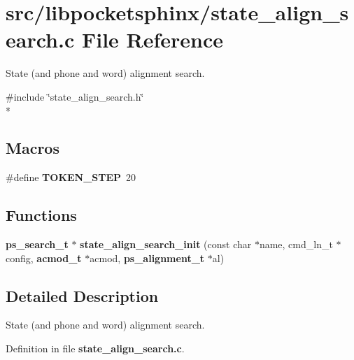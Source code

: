 \section{src/libpocketsphinx/state\-\_\-align\-\_\-search.c File Reference}
\label{state__align__search_8c}


State (and phone and word) alignment search.  


{\ttfamily \#include \char`\"{}state\-\_\-align\-\_\-search.\-h\char`\"{}}\\*
\subsection*{Macros}
\begin{DoxyCompactItemize}
\item 
\#define {\bfseries T\-O\-K\-E\-N\-\_\-\-S\-T\-E\-P}~20\label{state__align__search_8c_a197a0cf5b150b88b0e3043fd78550931}

\end{DoxyCompactItemize}
\subsection*{Functions}
\begin{DoxyCompactItemize}
\item 
{\bf ps\-\_\-search\-\_\-t} $\ast$ {\bfseries state\-\_\-align\-\_\-search\-\_\-init} (const char $\ast$name, cmd\-\_\-ln\-\_\-t $\ast$config, {\bf acmod\-\_\-t} $\ast$acmod, {\bf ps\-\_\-alignment\-\_\-t} $\ast$al)\label{state__align__search_8c_a037465636cb9d40dd1ebc1e04c0fd633}

\end{DoxyCompactItemize}


\subsection{Detailed Description}
State (and phone and word) alignment search. 

Definition in file {\bf state\-\_\-align\-\_\-search.\-c}.

